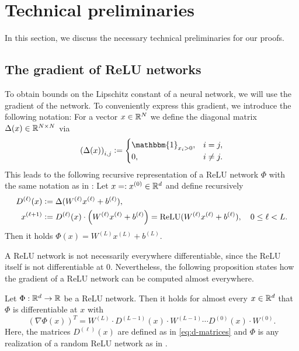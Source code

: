
\section{Technical preliminaries}\label{sec:preliminaries}

In this section, we discuss the necessary technical preliminaries for our proofs.

\subsection{The gradient of ReLU networks}
\label{subsec:gradient}

To obtain bounds on the Lipschitz constant of a neural network,
we will use the gradient of the network.
To conveniently express this gradient, we introduce the following notation:
For a vector $x \in \mathbb{R}^N$ we define the diagonal matrix $\operatorname{\Delta}(x) \in \mathbb{R}^{N \times N}$ via
\begin{equation*}
  \left(\diag(x)\right)_{i,j}
  \defeq \begin{cases}
            \mathbbm{1}_{x_i > 0},& i=j, \\
            0,                    &i \neq j .
          \end{cases}
\end{equation*}
This leads to the following recursive representation of a ReLU network $\Phi$
with the same notation as in :
Let $x =: x^{(0)} \in \mathbb{R}^d$ and define recursively 
\begin{align} \label{eq:d-matrices}
  D^{(\ell)}(x)
  &\mathrel{\mathop:}= \operatorname{\Delta}(W^{(\ell)}x^{(\ell)} + b^{(\ell)}), \nonumber\\
  x^{(\ell +1)}
  &\mathrel{\mathop:}= D^{(\ell)}(x) \cdot \left(W^{(\ell)}x^{(\ell)} + b^{(\ell)}\right)
         = \operatorname{ReLU}(W^{(\ell)}x^{(\ell)} + b^{(\ell)}),
  \quad 0 \leq \ell < L.
\end{align}
Then it holds $\Phi(x) = W^{(L)}x^{(L)} + b^{(L)}$.

A ReLU network is not necessarily everywhere differentiable,
since the ReLU itself is not differentiable at $0$.
Nevertheless, the following proposition states how the gradient of a ReLU network
can be computed almost everywhere.

\begin{proposition}\label{prop:grad_relu}
Let $\Phi : \mathbb{R}^d \to \mathbb{R}$ be a ReLU network. Then it holds for almost every $x \in \mathbb{R}^d$ that $\Phi$ is differentiable at $x$ with
\begin{equation*}
\left(\nabla \Phi (x) \right)^T = W^{(L)} \cdot D^{(L-1)}(x) \cdot W^{(L-1)} \cdots D^{(0)}(x)\cdot W^{(0)}.
\end{equation*}
Here, the matrices $D^{(\ell)}(x)$ are defined as in \eqref{eq:d-matrices} and $\Phi$ is any realization of a random ReLU network as in . 
\end{proposition}

